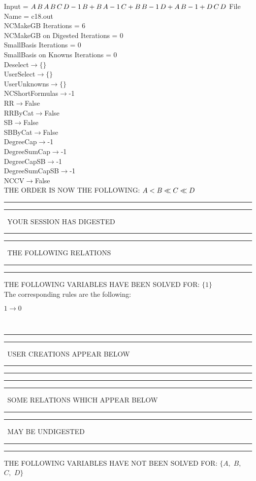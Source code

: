 \documentclass[rep10,leqno]{report}
\begin{document}
\normalsize
\baselineskip=12pt
\noindent
Input = 
$
\\A\,
 B\,
 A\,
 B\,
 C\,
 D\\
-1\,
 B + B\,
 A\\
-1\,
 C + B\,
 B\\
-1\,
 D + A\,
 B\\
-1 + D\,
 C\,
 D\\
$
File Name = c18.out\\
NCMakeGB Iterations = 6\\
NCMakeGB on Digested Iterations = 0\\
SmallBasis Iterations = 0\\
SmallBasis on Knowns Iterations = 0\\
Deselect$\rightarrow \{\}$\\
UserSelect$\rightarrow \{\}$\\
UserUnknowns$\rightarrow \{\}$\\
NCShortFormulas$\rightarrow$-1\\
RR$\rightarrow $False\\
RRByCat$\rightarrow $False\\
SB$\rightarrow $False\\
SBByCat$\rightarrow $False\\
DegreeCap$\rightarrow $-1\\
DegreeSumCap$\rightarrow $-1\\
DegreeCapSB$\rightarrow $-1\\
DegreeSumCapSB$\rightarrow $-1\\
NCCV$\rightarrow $False\\
THE ORDER IS NOW THE FOLLOWING:\hfil\break
$
A<B\ll
C\ll
D\\
$
\rule[2pt]{6in}{4pt}\hfil\break
\rule[2pt]{1.879in}{4pt}
\ YOUR SESSION HAS DIGESTED\ 
\rule[2pt]{1.879in}{4pt}\hfil\break
\rule[2pt]{1.923in}{4pt}
\ THE FOLLOWING RELATIONS\ 
\rule[2pt]{1.923in}{4pt}\hfil\break
\rule[2pt]{6in}{4pt}\hfil\break
THE FOLLOWING VARIABLES HAVE BEEN SOLVED FOR:\hfil\break
$\{1\}$
\smallskip\\
The corresponding rules are the following:\smallskip\\
\begin{minipage}{6in}
$
1\rightarrow 0
$
\end{minipage}\medskip\\
\rule[2pt]{6in}{1pt}\hfil\break
\rule[2.5pt]{1.701in}{1pt}
\ USER CREATIONS APPEAR BELOW\ 
\rule[2.5pt]{1.701in}{1pt}\hfil\break
\rule[2pt]{6in}{1pt}\hfil\break
\rule[2pt]{6in}{4pt}\hfil\break
\rule[2pt]{1.45in}{4pt}
\ SOME RELATIONS WHICH APPEAR BELOW\ 
\rule[2pt]{1.45in}{4pt}\hfil\break
\rule[2pt]{2.18in}{4pt}
\ MAY BE UNDIGESTED\ 
\rule[2pt]{2.18in}{4pt}\hfil\break
\rule[2pt]{6in}{4pt}\hfil\break
THE FOLLOWING VARIABLES HAVE NOT BEEN SOLVED FOR:\hfil\break
$\{A,
$ $
B,
$ $
C,
$ $
D\}$
\smallskip\\
\vspace{10pt}
\end{document}
